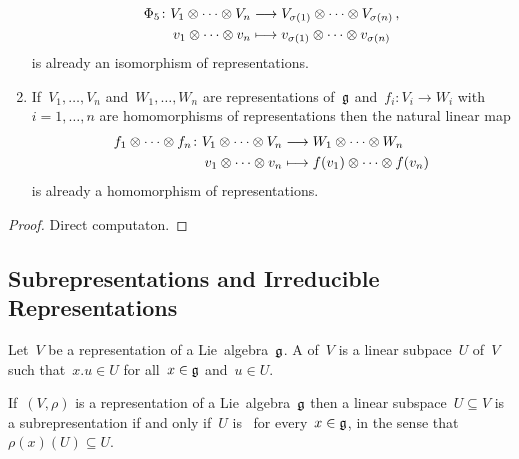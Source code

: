 \begin{proposition}
\begin{enumerate}[leftmargin=*]
      \begin{align*}
        \Phi_5
        \colon 
        V_1 \otimes \dotsb \otimes V_n
        &\longrightarrow
        V_{\sigma(1)} \otimes \dotsb \otimes V_{\sigma(n)} \,,
        \\
        v_1 \otimes \dotsb \otimes v_n
        &\longmapsto
        v_{\sigma(1)} \otimes \dotsb \otimes v_{\sigma(n)}
      \end{align*}
      is already an isomorphism of representations.
    \item
      If~$V_1, \dotsc, V_n$ and~$W_1, \dotsc, W_n$ are representations of~$\mathfrak{g}$ and~$f_i \colon V_i \to W_i$ with~$i = 1, \dotsc, n$ are homomorphisms of representations then the natural linear map
      \begin{align*}
        f_1 \otimes \dotsb \otimes f_n
        \colon
        V_1 \otimes \dotsb \otimes V_n
        &\longrightarrow
        W_1 \otimes \dotsb \otimes W_n
        \\
        v_1 \otimes \dotsb \otimes v_n
        &\longmapsto
        f(v_1) \otimes \dotsb \otimes f(v_n)
      \end{align*}
      is already a homomorphism of representations.
  \end{enumerate}
\end{proposition}


\begin{proof}
  Direct computaton.
\end{proof} 





\subsection{Subrepresentations and Irreducible Representations}


\begin{definition}
  Let~$V$ be a representation of a Lie~algebra~$\mathfrak{g}$.
  A  of~$V$ is a linear subpace~$U$ of~$V$ such that~$x.u \in U$ for all~$x \in \mathfrak{g}$ and~$u \in U$.
\end{definition}

\begin{remark}
  If~$(V, \rho)$ is a representation of a Lie~algebra~$\mathfrak{g}$ then a linear subspace~$U \subseteq V$ is a subrepresentation if and only if~$U$ is~{} for every~$x \in \mathfrak{g}$, in the sense that~$\rho(x)(U) \subseteq U$.
\end{remark}




